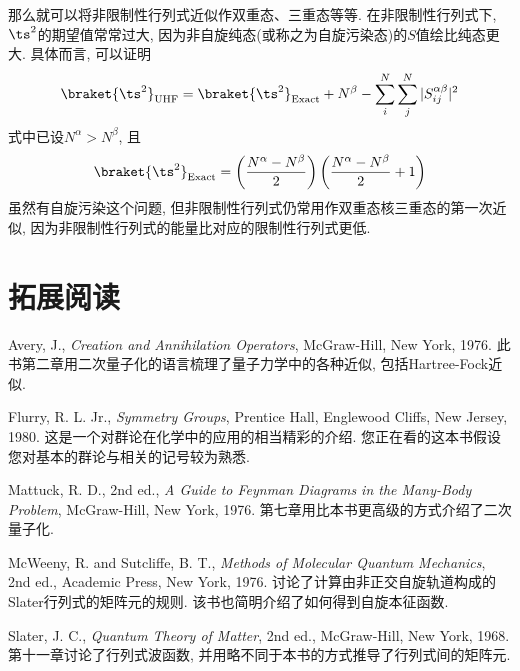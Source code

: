 那么就可以将非限制性行列式近似作双重态、三重态等等. 
在非限制性行列式下, 
$\ts^2$的期望值常常过大, 
因为非自旋纯态(或称之为自旋污染态)的$S$值绘比纯态更大. 
具体而言, 
可以证明
\begin{align}\label{eq:2.271}
\braket{\ts^2}_\mathrm{UHF} = \braket{\ts^2}_\mathrm{Exact} + N^\beta - \sum_i^N\sum_j^N|S_{ij}^{\alpha\beta}|^2
\end{align}
式中已设$N^\alpha > N^\beta$, 
且
\begin{align}
	\braket{\ts^2}_\mathrm{Exact} = \left( \frac{N^\alpha - N^\beta}{2} \right) \left( \frac{N^\alpha - N^\beta}{2} + 1\right)
\end{align}
虽然有自旋污染这个问题, 
但非限制性行列式仍常用作双重态核三重态的第一次近似, 
因为非限制性行列式的能量比对应的限制性行列式更低.


\theendnotes
{}
\section*{拓展阅读}

\indent Avery, J., \textit{Creation and Annihilation Operators}, McGraw-Hill, New York, 1976. 
此书第二章用二次量子化的语言梳理了量子力学中的各种近似, 包括Hartree-Fock近似.

Flurry, R. L. Jr., \textit{Symmetry Groups}, Prentice Hall, Englewood Cliffs, New Jersey, 1980. 
这是一个对群论在化学中的应用的相当精彩的介绍. 您正在看的这本书假设您对基本的群论与相关的记号较为熟悉.

Mattuck, R. D., 2nd ed., \textit{A Guide to Feynman Diagrams in the Many-Body Problem}, McGraw-Hill, New York, 1976. 
第七章用比本书更高级的方式介绍了二次量子化.

McWeeny, R. and Sutcliffe, B. T., \textit{Methods of Molecular Quantum Mechanics}, 2nd ed., Academic Press, New York, 1976. 
讨论了计算由非正交自旋轨道构成的Slater行列式的矩阵元的规则. 该书也简明介绍了如何得到自旋本征函数.

Slater, J. C., \textit{Quantum Theory of Matter}, 2nd ed., McGraw-Hill, New York, 1968. 
第十一章讨论了行列式波函数, 并用略不同于本书的方式推导了行列式间的矩阵元.
